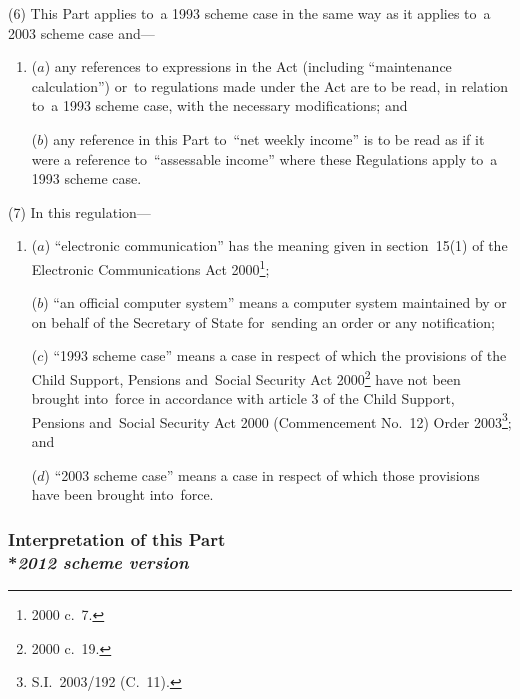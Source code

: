 \documentclass[12pt,a4paper]{article}
\begin{document}
(6) This Part applies to~a 1993 scheme case in the same way as it applies to~a 2003 scheme case and—
\begin{enumerate}\item[]
($a$) any references to expressions in the Act (including “maintenance calculation”) or~to regulations made under the Act are to be read, in relation to~a 1993 scheme case, with the necessary modifications; and

($b$) any reference in this Part to~“net weekly income” is to be read as if it were a reference to~“assessable income” where these Regulations apply to~a 1993 scheme case.
\end{enumerate}

(7) In this regulation—
\begin{enumerate}\item[]
($a$) “electronic communication” has the meaning given in section~15(1) of the Electronic Communications Act 2000\footnote{2000 c.~7.};

($b$) “an official computer system” means a computer system maintained by or on behalf of the 
Secretary of State  %
for~sending an order or any notification;

($c$) “1993 scheme case” means a case in respect of which the provisions of the Child Support, Pensions and~Social Security Act 2000\footnote{2000 c.~19.} have not been brought into~force in accordance with article 3 of the Child Support, Pensions and~Social Security Act 2000 (Commencement No.~12) Order 2003\footnote{S.I.~2003/192 (C.~11).}; and

($d$) “2003 scheme case” means a case in respect of which those provisions have been brought into~force.
\end{enumerate}


\subsubsection[25A. Interpretation of this Part -- \emph{2012 scheme version}]{Interpretation of this Part\\*\emph{2012 scheme version}}
\end{document}
